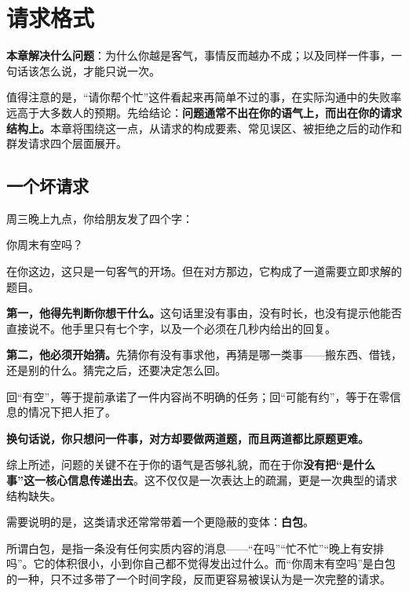 \chapter{请求格式}


\begin{guideblock}
\textbf{本章解决什么问题}：为什么你越是客气，事情反而越办不成；以及同样一件事，一句话该怎么说，才能只说一次。
\end{guideblock}

值得注意的是，“请你帮个忙”这件看起来再简单不过的事，在实际沟通中的失败率远高于大多数人的预期。先给结论：\textbf{问题通常不出在你的语气上，而出在你的请求结构上。}本章将围绕这一点，从请求的构成要素、常见误区、被拒绝之后的动作和群发请求四个层面展开。

\hcirule

\section{一个坏请求}

周三晚上九点，你给朋友发了四个字：

\begin{mdquote}
你周末有空吗？
\end{mdquote}

在你这边，这只是一句客气的开场。但在对方那边，它构成了一道需要立即求解的题目。

\textbf{第一，他得先判断你想干什么。}这句话里没有事由，没有时长，也没有提示他能否直接说不。他手里只有七个字，以及一个必须在几秒内给出的回复。

\textbf{第二，他必须开始猜。}先猜你有没有事求他，再猜是哪一类事——搬东西、借钱，还是别的什么。猜完之后，还要决定怎么回。

回“有空”，等于提前承诺了一件内容尚不明确的任务；回“可能有约”，等于在零信息的情况下把人拒了。

\textbf{换句话说，你只想问一件事，对方却要做两道题，而且两道都比原题更难。}

综上所述，问题的关键不在于你的语气是否够礼貌，而在于你\textbf{没有把“是什么事”这一核心信息传递出去}。这不仅仅是一次表达上的疏漏，更是一次典型的请求结构缺失。

需要说明的是，这类请求还常常带着一个更隐蔽的变体：\textbf{白包}。

所谓白包，是指一条没有任何实质内容的消息——“在吗”“忙不忙”“晚上有安排吗”。它的体积很小，小到你自己都不觉得发出过什么。而“你周末有空吗”是白包的一种，只不过多带了一个时间字段，反而更容易被误认为是一次完整的请求。


